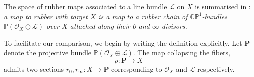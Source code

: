 \documentclass[a4paper,12pt]{article} %
\newcommand{\bb}[1]{{\mathbb{#1}}}
\newcommand{\ca}[1]{{\mathcal{#1}}}
\theoremstyle{definition}
\theoremstyle{plain}%
\begin{document}
The space of rubber maps associated to a line bundle $\ca L$ on $X$ is summarised in \cite{Janda2018Double-ramifica}:
\emph{a map to rubber with target $X$ is a map to a rubber chain of $\bb C\bb P^1$-bundles $\bb P(\ca O_X \oplus \ca L)$ over $X$ attached along their 0  and $\infty$ divisors.}

\newcommand{\R}{R}
To facilitate our comparison, we begin by writing the definition explicitly. 
Let $\mathbf{P}$ denote the projective bundle $\bb P(\ca O_X \oplus \ca L)$.
The map collapsing the fibers,
\begin{equation}\label{55772}
\rho: \mathbf{P} \to X\ 
\end{equation}
admits two sections $r_0,r_\infty:X\to \mathbf{P}$
corresponding to $\ca O_X$ and $\ca L$ respectively.
\end{document}
